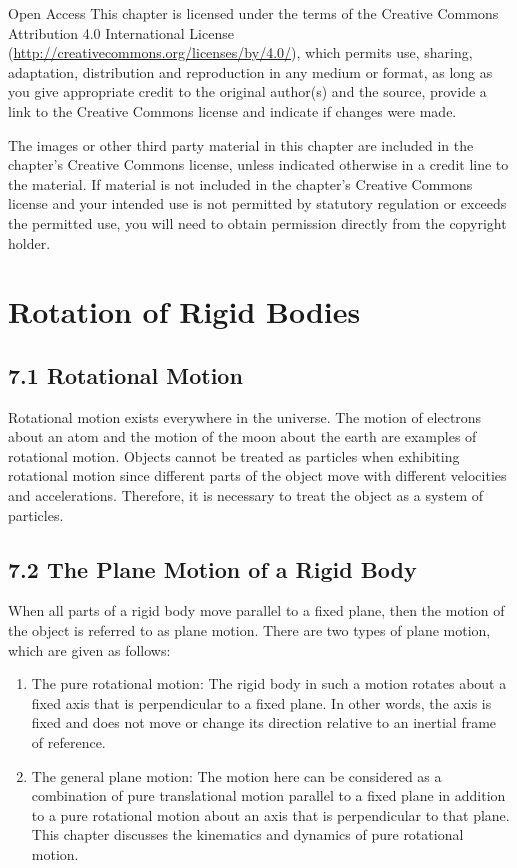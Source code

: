 \documentclass[10pt]{article}
\begin{document}
Open Access This chapter is licensed under the terms of the Creative Commons Attribution 4.0 International License (\href{http://creativecommons.org/licenses/by/4.0/}{http://creativecommons.org/licenses/by/4.0/}), which permits use, sharing, adaptation, distribution and reproduction in any medium or format, as long as you give appropriate credit to the original author(s) and the source, provide a link to the Creative Commons license and indicate if changes were made.

The images or other third party material in this chapter are included in the chapter's Creative Commons license, unless indicated otherwise in a credit line to the material. If material is not included in the chapter's Creative Commons license and your intended use is not permitted by statutory regulation or exceeds the permitted use, you will need to obtain permission directly from the copyright holder.

\section*{Rotation of Rigid Bodies}
\subsection*{7.1 Rotational Motion}
Rotational motion exists everywhere in the universe. The motion of electrons about an atom and the motion of the moon about the earth are examples of rotational motion. Objects cannot be treated as particles when exhibiting rotational motion since different parts of the object move with different velocities and accelerations. Therefore, it is necessary to treat the object as a system of particles.

\subsection*{7.2 The Plane Motion of a Rigid Body}
When all parts of a rigid body move parallel to a fixed plane, then the motion of the object is referred to as plane motion. There are two types of plane motion, which are given as follows:

\begin{enumerate}
  \item The pure rotational motion: The rigid body in such a motion rotates about a fixed axis that is perpendicular to a fixed plane. In other words, the axis is fixed and does not move or change its direction relative to an inertial frame of reference.
  \item The general plane motion: The motion here can be considered as a combination of pure translational motion parallel to a fixed plane in addition to a pure rotational motion about an axis that is perpendicular to that plane. This chapter discusses the kinematics and dynamics of pure rotational motion.
\end{enumerate}
\end{document}

